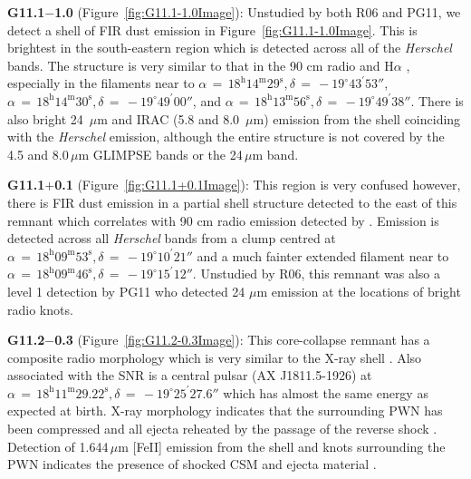 \documentclass[fleqn,usenatbib]{mnras}
\begin{document}
{\textbf{G11.1$-$1.0} (Figure~\ref{fig:G11.1-1.0Image}): Unstudied by both R06 and PG11, we detect a shell of FIR dust emission in Figure~\ref{fig:G11.1-1.0Image}. This is brightest in the south-eastern region which is detected across all of the \textit{Herschel} bands. The structure is very similar to that in the 90 cm radio \citep{Brogan2006} and H$\alpha$ \citep{Stupar2011}, especially in the filaments near to $\alpha\,=\,18^\text{h}14^\text{m}29^\text{s}, \delta\,=\,-19^\circ43^\prime53''$, $\alpha\,=\,18^\text{h}14^\text{m}30^\text{s}, \delta\,=\,-19^\circ49^\prime00''$, and $\alpha\,=\,18^\text{h}13^\text{m}56^\text{s}, \delta\,=\,-19^\circ49^\prime38''$. There is also bright 24~$\mu$m and IRAC (5.8 and 8.0~$\mu$m) emission from the shell coinciding with the \textit{Herschel} emission, although the entire structure is not covered by the 4.5 and 8.0\,$\mu$m GLIMPSE bands or the 24\,$\mu$m band.
\bigskip

\textbf{G11.1$+$0.1} (Figure~\ref{fig:G11.1+0.1Image}): This region is very confused however, there is FIR dust emission in a partial shell structure detected to the east of this remnant which correlates with 90 cm radio emission detected by \citet{Brogan2004}. Emission is detected across all \textit{Herschel} bands from a clump centred at $\alpha\,=\,18^\text{h}09^\text{m}53^\text{s}, \delta\,=\,-19^\circ10^\prime21''$ and a much fainter extended filament near to $\alpha\,=\,18^\text{h}09^\text{m}46^\text{s}, \delta\,=\,-19^\circ15^\prime12''$. Unstudied by R06, this remnant was also a level 1 detection by PG11 who detected 24 $\mu$m emission at the locations of bright radio knots.
\bigskip

\textbf{G11.2$-$0.3} (Figure~\ref{fig:G11.2-0.3Image}): This core-collapse remnant has a composite radio morphology which is very similar to the X-ray shell \citep{Vasisht1996, Chevalier2005}. Also associated with the SNR is a central pulsar (AX J1811.5-1926) at $\alpha\,=\,18^\text{h}11^\text{m}29.22^\text{s}, \delta\,=\,-19^\circ25^\prime27.6''$ \citep{Kaspi2001} which has almost the same energy as expected at birth. X-ray morphology indicates that the surrounding PWN has been compressed and all ejecta reheated by the passage of the reverse shock \citep{Torii1997, Borkowski2016}.
Detection of 1.644\,$\mu$m [FeII] emission from the shell and knots surrounding the PWN indicates the presence of shocked CSM and ejecta material \citep{Koo2007, Moon2009}.

}
\end{document}
